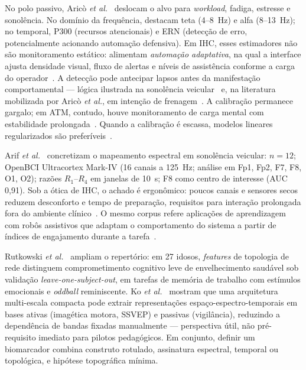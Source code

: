 \documentclass[12pt]{article}
\begin{document}
No polo passivo, Aric\`{o} \textit{et al.}~\cite{Arico2017} deslocam o alvo para \textit{workload}, fadiga, estresse e sonol\^{e}ncia. No dom\'{i}nio da frequ\^{e}ncia, destacam teta (4--8~Hz) e alfa (8--13~Hz); no temporal, P300 (recursos atencionais) e ERN (detec\c{c}\~{a}o de erro, potencialmente acionando automa\c{c}\~{a}o defensiva). Em IHC, esses estimadores n\~{a}o s\~{a}o monitoramento est\'{a}tico: alimentam \textit{automa\c{c}\~{a}o adaptativa}, na qual a interface ajusta densidade visual, fluxo de alertas e n\'{i}veis de assist\^{e}ncia conforme a carga do operador~\cite{Arico2017,Arico2016ATM}. A detec\c{c}\~{a}o pode antecipar lapsos antes da manifesta\c{c}\~{a}o comportamental --- l\'{o}gica ilustrada na sonol\^{e}ncia veicular~\cite{Arif2023} e, na literatura mobilizada por Aric\`{o} \textit{et al.}, em inten\c{c}\~{a}o de frenagem~\cite{Haufe2014}. A calibra\c{c}\~{a}o permanece gargalo; em ATM, contudo, houve monitoramento de carga mental com estabilidade prolongada~\cite{Arico2016ATM}. Quando a calibra\c{c}\~{a}o \'{e} escassa, modelos lineares regularizados s\~{a}o prefer\'{i}veis~\cite{Arico2017,Lotte2018}.

Arif \textit{et al.}~\cite{Arif2023} concretizam o mapeamento espectral em sonol\^{e}ncia veicular: $n=12$; OpenBCI Ultracortex Mark-IV (16 canais a 125~Hz; an\'{a}lise em Fp1, Fp2, F7, F8, O1, O2); raz\~{o}es $R_1$--$R_4$ em janelas de 10~s; F8 como centro de interesse (AUC 0{,}91). Sob a \'{o}tica de IHC, o achado \'{e} ergon\^{o}mico: poucos canais e sensores secos reduzem desconforto e tempo de prepara\c{c}\~{a}o, requisitos para intera\c{c}\~{a}o prolongada fora do ambiente cl\'{i}nico~\cite{Arico2017,Arif2023}. O mesmo corpus refere aplica\c{c}\~{o}es de aprendizagem com rob\^{o}s assistivos que adaptam o comportamento do sistema a partir de \'{i}ndices de engajamento durante a tarefa~\cite{Arif2023}.

Rutkowski \textit{et al.}~\cite{Rutkowski2023} ampliam o repert\'{o}rio: em 27 idosos, \textit{features} de topologia de rede distinguem comprometimento cognitivo leve de envelhecimento saud\'{a}vel sob valida\c{c}\~{a}o \textit{leave-one-subject-out}, em tarefas de mem\'{o}ria de trabalho com est\'{i}mulos emocionais e \textit{oddball} reminiscente. Ko \textit{et al.}~\cite{Ko2021} mostram que uma arquitetura multi-escala compacta pode extrair representa\c{c}\~{o}es espa\c{c}o-espectro-temporais em bases ativas (imag\'{e}tica motora, SSVEP) e passivas (vigil\^{a}ncia), reduzindo a depend\^{e}ncia de bandas fixadas manualmente --- perspectiva \'{u}til, n\~{a}o pr\'{e}-requisito imediato para pilotos pedag\'{o}gicos. Em conjunto, definir um biomarcador combina construto rotulado, assinatura espectral, temporal ou topol\'{o}gica, e hip\'{o}tese topogr\'{a}fica m\'{i}nima.
\end{document}
